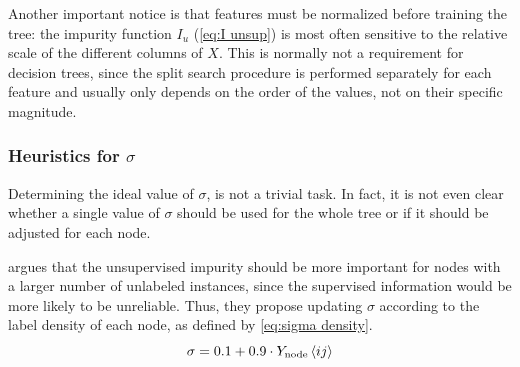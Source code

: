 Another important notice is that features must be normalized before training the tree: the impurity function $I_u$ (\autoref{eq:I unsup}) is most often sensitive to the relative scale of the different columns of $X$. This is normally not a requirement for decision trees, since the split search procedure is performed separately for each feature and usually only depends on the order of the values, not on their specific magnitude.



\subsubsection{Heuristics for $\sigma$}
\label{sec:sigma heuristics}

Determining the ideal value of $\sigma$, is not a trivial task. In fact, it is not even clear whether a single value of $\sigma$ should be used for the whole tree or if it should be adjusted for each node.



\textcite{alves2023semisupervised} argues that the unsupervised impurity should be more important for nodes with a larger number of unlabeled instances, since the supervised information would be more likely to be unreliable. Thus, they propose updating $\sigma$ according to the label density of each node, as defined by \autoref{eq:sigma density}.
%
\begin{equation}
    \sigma = 0.1 + 0.9 \cdot Y_\text{node}\left\langle ij\right\rangle
    \label{eq:sigma density}
\end{equation}

